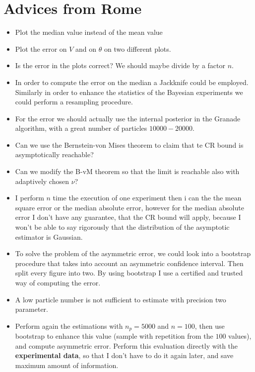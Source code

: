 \documentclass[aps, pra, 10pt, twocolumn, superscriptaddress,floatfix]{revtex4-1}
\begin{document}
\section{Advices from Rome}

\begin{itemize}
	\item Plot the median value instead of the mean value
	\item {\color{red}Plot the error on $V$ and on $\theta$ on two different plots.}
	\item Is the error in the plots correct? We should maybe divide by a factor $n$.\\
	\item In order to compute the error on the median a Jackknife could be employed. Similarly in order to enhance the statistics of the Bayesian experiments we could perform a resampling procedure.
	\item For the error we should actually use the internal posterior in the Granade algorithm, with a great number of particles $10000-20000$.
	\item Can we use the Bernstein-von Mises theorem to claim that te CR bound is asymptotically reachable?
	\item Can we modify the B-vM theorem so that the limit is reachable also with adaptively chosen $\nu$?
	
	\item I perform $n$ time the execution of one experiment then i can the the mean square error or the median absolute error, however for the median absolute error I don't have any guarantee, that the CR bound will apply, because I won't be able to say rigorously that the distribution of the asymptotic estimator is Gaussian.
	
	\item To solve the problem of the asymmetric error, we could look into a bootstrap procedure that takes into account an asymmetric confidence interval. Then split every figure into two. By using  bootstrap I use a certified and trusted way of computing the error.
	
	\item A low particle number is not sufficient to estimate with precision two parameter.
	
	\item Perform again the estimations with $n_p = 5000$ and $n = 100$, then use bootstrap to enhance this value (sample with repetition from the $100$ values), and compute asymmetric error. Perform this evaluation directly with the \textbf{experimental data}, so that I don't have to do it again later, and save maximum amount of information.
	

\end{itemize}
\end{document}
